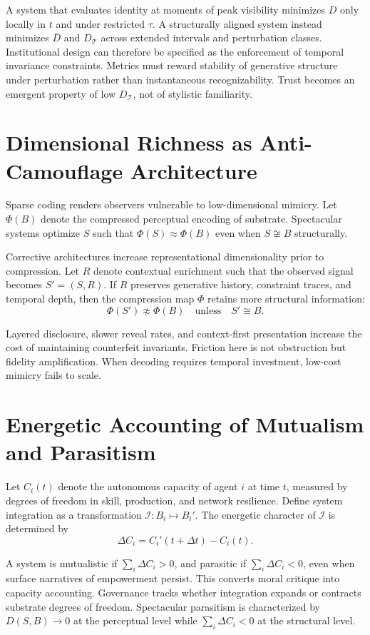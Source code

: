 \documentclass[11pt]{article}
\begin{document}
A system that evaluates identity at moments of peak visibility minimizes $D$ only locally in $t$ and under restricted $\tau$. A structurally aligned system instead minimizes $\bar{D}$ and $D_{\mathcal{T}}$ across extended intervals and perturbation classes. Institutional design can therefore be specified as the enforcement of temporal invariance constraints. Metrics must reward stability of generative structure under perturbation rather than instantaneous recognizability. Trust becomes an emergent property of low $D_{\mathcal{T}}$, not of stylistic familiarity.

\section{Dimensional Richness as Anti-Camouflage Architecture}

Sparse coding renders observers vulnerable to low-dimensional mimicry. Let $\Phi(B)$ denote the compressed perceptual encoding of substrate. Spectacular systems optimize $S$ such that $\Phi(S) \approx \Phi(B)$ even when $S \not\cong B$ structurally.

Corrective architectures increase representational dimensionality prior to compression. Let $R$ denote contextual enrichment such that the observed signal becomes $S' = (S, R)$. If $R$ preserves generative history, constraint traces, and temporal depth, then the compression map $\Phi$ retains more structural information:
\[
\Phi(S') \not\approx \Phi(B) \quad \text{unless} \quad S' \cong B.
\]

Layered disclosure, slower reveal rates, and context-first presentation increase the cost of maintaining counterfeit invariants. Friction here is not obstruction but fidelity amplification. When decoding requires temporal investment, low-cost mimicry fails to scale.

\section{Energetic Accounting of Mutualism and Parasitism}

Let $C_i(t)$ denote the autonomous capacity of agent $i$ at time $t$, measured by degrees of freedom in skill, production, and network resilience. Define system integration as a transformation $\mathcal{I} : B_i \mapsto B_i'$. The energetic character of $\mathcal{I}$ is determined by
\[
\Delta C_i = C_i'(t + \Delta t) - C_i(t).
\]

A system is mutualistic if $\sum_i \Delta C_i > 0$, and parasitic if $\sum_i \Delta C_i < 0$, even when surface narratives of empowerment persist. This converts moral critique into capacity accounting. Governance tracks whether integration expands or contracts substrate degrees of freedom. Spectacular parasitism is characterized by $D(S,B) \to 0$ at the perceptual level while $\sum_i \Delta C_i < 0$ at the structural level.
\end{document}
